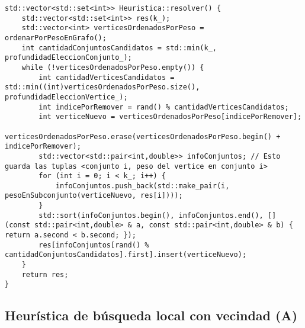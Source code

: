 \begin{lstlisting}[frame=single]
std::vector<std::set<int>> Heuristica::resolver() {
    std::vector<std::set<int>> res(k_);
    std::vector<int> verticesOrdenadosPorPeso = ordenarPorPesoEnGrafo();
    int cantidadConjuntosCandidatos = std::min(k_, profundidadEleccionConjunto_);
    while (!verticesOrdenadosPorPeso.empty()) {
        int cantidadVerticesCandidatos = std::min((int)verticesOrdenadosPorPeso.size(), profundidadEleccionVertice_);
        int indicePorRemover = rand() % cantidadVerticesCandidatos;
        int verticeNuevo = verticesOrdenadosPorPeso[indicePorRemover];
        verticesOrdenadosPorPeso.erase(verticesOrdenadosPorPeso.begin() + indicePorRemover);
        std::vector<std::pair<int,double>> infoConjuntos; // Esto guarda las tuplas <conjunto i, peso del vertice en conjunto i>
        for (int i = 0; i < k_; i++) {
            infoConjuntos.push_back(std::make_pair(i, pesoEnSubconjunto(verticeNuevo, res[i])));
        }
        std::sort(infoConjuntos.begin(), infoConjuntos.end(), [] (const std::pair<int,double> & a, const std::pair<int,double> & b) { return a.second < b.second; });
        res[infoConjuntos[rand() % cantidadConjuntosCandidatos].first].insert(verticeNuevo);
    }
    return res;
}
\end{lstlisting}

\newpage

\subsection{Heurística de búsqueda local con vecindad (A)}


